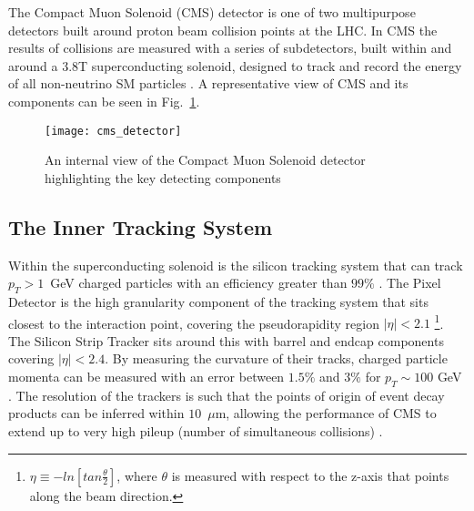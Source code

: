 

The Compact Muon Solenoid (CMS) detector is one of two multipurpose detectors built around proton beam collision points at the LHC. In CMS the results of collisions are measured with a series of subdetectors, built within and around a 3.8T superconducting solenoid, designed to track and record the energy of all non-neutrino SM particles \cite{CMSTechDesign1DetectorPerformance}. A representative view of CMS and its components can be seen in Fig.~\ref{fig:CMS}.
\begin{figure}
	\begin{center}
		\texttt{[image: cms\_detector]}
	\end{center}
	\caption{An internal view of the Compact Muon Solenoid detector highlighting the key detecting components \cite{CMSTechDesign1DetectorPerformance}}
	\label{fig:CMS}
\end{figure}

\subsection{The Inner Tracking System}
Within the superconducting solenoid is the silicon tracking system that can track \mbox{$p_T>1$~GeV} charged particles with an efficiency greater than $99\%$ \cite{ScienceArticle} \cite{CMSTechDesign1DetectorPerformance}. The Pixel Detector is the high granularity component of the tracking system that sits closest to the interaction point, covering the pseudorapidity region $|\eta|<2.1$ \footnote{$\eta \equiv -ln[tan\frac{\theta}{2}]$, where $\theta$ is measured with respect to the z-axis that points along the beam direction.}. The Silicon Strip Tracker sits around this with barrel and endcap components covering $|\eta|<2.4$. By measuring the curvature of their tracks, charged particle momenta can be measured with an error between $1.5\%$ and $3\%$ for $p_T\sim 100$ GeV \cite{Adam_Elwood_MSci}. The resolution of the trackers is such that the points of origin of event decay products can be inferred within $10$~$\mu$m, allowing the performance of CMS to extend up to very high pileup (number of simultaneous collisions) \cite{CMSTrackPerformance}.

